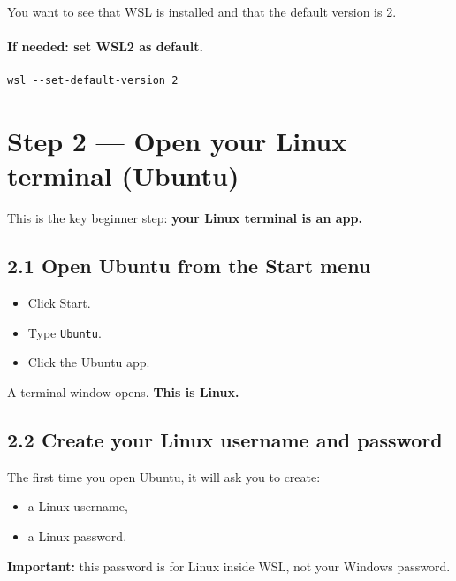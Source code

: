 You want to see that WSL is installed and that the default version is 2.

\paragraph{If needed: set WSL2 as default.}
\begin{lstlisting}
wsl --set-default-version 2
\end{lstlisting}

\section{Step 2 --- Open your Linux terminal (Ubuntu)}
This is the key beginner step: \textbf{your Linux terminal is an app.}


\subsection{2.1 Open Ubuntu from the Start menu}
\begin{itemize}[leftmargin=*]
  \item Click Start.
  \item Type \texttt{Ubuntu}.
  \item Click the Ubuntu app.
\end{itemize}

A terminal window opens. \textbf{This is Linux.}

\subsection{2.2 Create your Linux username and password}
The first time you open Ubuntu, it will ask you to create:
\begin{itemize}[leftmargin=*]
  \item a Linux username,
  \item a Linux password.
\end{itemize}

\textbf{Important:} this password is for Linux inside WSL, not your Windows password.


